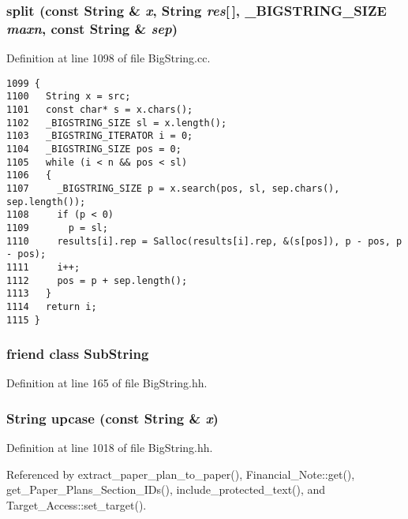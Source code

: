 \subsubsection{ split (const String \& {\em x}, String {\em res}[$\,$], {\bf \_\-BIGSTRING\_\-SIZE} {\em maxn}, const String \& {\em sep})\hspace{0.3cm}{\tt  [friend]}}\label{classString_l37}




Definition at line 1098 of file Big\-String.cc.



\footnotesize\begin{verbatim}1099 {
1100   String x = src;
1101   const char* s = x.chars();
1102   _BIGSTRING_SIZE sl = x.length();
1103   _BIGSTRING_ITERATOR i = 0;
1104   _BIGSTRING_SIZE pos = 0;
1105   while (i < n && pos < sl)
1106   {
1107     _BIGSTRING_SIZE p = x.search(pos, sl, sep.chars(), sep.length());
1108     if (p < 0)
1109       p = sl;
1110     results[i].rep = Salloc(results[i].rep, &(s[pos]), p - pos, p - pos);
1111     i++;
1112     pos = p + sep.length();
1113   }
1114   return i;
1115 }
\end{verbatim}\normalsize 
{}
\subsubsection{\setlength{\rightskip}{0pt plus 5cm}friend class Sub\-String\hspace{0.3cm}{\tt  [friend]}}\label{classString_l0}




Definition at line 165 of file Big\-String.hh.
\subsubsection{\setlength{\rightskip}{0pt plus 5cm}String upcase (const String \& {\em x})\hspace{0.3cm}{\tt  [friend]}}\label{classString_l45}




Definition at line 1018 of file Big\-String.hh.

Referenced by extract\_\-paper\_\-plan\_\-to\_\-paper(), Financial\_\-Note::get(), get\_\-Paper\_\-Plans\_\-Section\_\-IDs(), include\_\-protected\_\-text(), and Target\_\-Access::set\_\-target().



